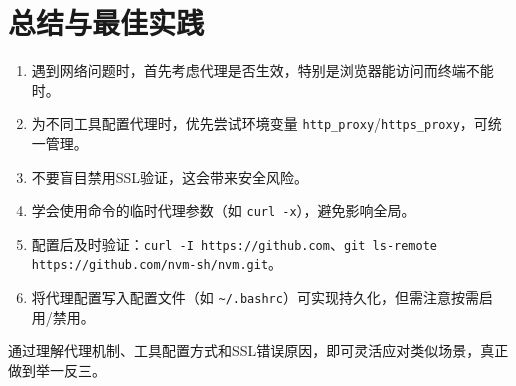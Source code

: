 \documentclass[12pt,a4paper]{article}
\begin{document}
\section{总结与最佳实践}
\begin{enumerate}
    \item 遇到网络问题时，首先考虑代理是否生效，特别是浏览器能访问而终端不能时。
    \item 为不同工具配置代理时，优先尝试环境变量 \texttt{http\_proxy}/\texttt{https\_proxy}，可统一管理。
    \item 不要盲目禁用SSL验证，这会带来安全风险。
    \item 学会使用命令的临时代理参数（如 \texttt{curl -x}），避免影响全局。
    \item 配置后及时验证：\texttt{curl -I https://github.com}、\texttt{git ls-remote https://github.com/nvm-sh/nvm.git}。
    \item 将代理配置写入配置文件（如 \texttt{\~{}/.bashrc}）可实现持久化，但需注意按需启用/禁用。
\end{enumerate}

通过理解代理机制、工具配置方式和SSL错误原因，即可灵活应对类似场景，真正做到举一反三。
\end{document}
